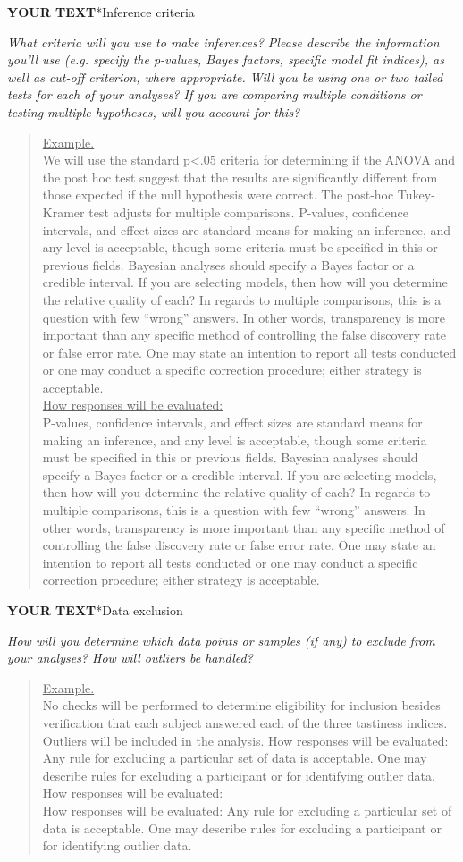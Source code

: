 \documentclass{article}
\newcommand{\example}[2]{\vspace{-0.3cm}\begin{quote}\underline{Example.}\\#1\ifx#2\undefined \else \\[0.2cm]\underline{How responses will be evaluated:}\\#2\fi\\\end{quote}}
\newcommand{\yourtext}[1]{\noindent\textbf{\color{red}YOUR TEXT}}
\begin{document}
	\yourtext
	
	\subsection*{Inference criteria}
	
	\ifx\hidehints\undefined
	
	\textit{%
		What criteria will you use to make inferences? Please describe the information you'll use (e.g. specify the p-values, Bayes factors, specific model fit indices), as well as cut-off criterion, where appropriate. Will you be using one or two tailed tests for each of your analyses? If you are comparing multiple conditions or testing multiple hypotheses, will you account for this? 
	}\\
	
	\example{
		We will use the standard p<.05 criteria for determining if the ANOVA and the post hoc test suggest that the results are significantly different from those expected if the null hypothesis were correct. The post-hoc Tukey-Kramer test adjusts for multiple comparisons.
	}{P-values, confidence intervals, and effect sizes are standard means for making an inference, and any level is acceptable, though some criteria must be specified in this or previous fields. Bayesian analyses should specify a Bayes factor or a credible interval. If you are selecting models, then how will you determine the relative quality of each? In regards to multiple comparisons, this is a question with few “wrong” answers. In other words, transparency is more important than any specific method of controlling the false discovery rate or false error rate. One may state an intention to report all tests conducted or one may conduct a specific correction procedure; either strategy is acceptable.}
	\fi
	
	\yourtext
	
	\subsection*{Data exclusion}
	
	\ifx\hidehints\undefined
	
	\textit{%
		How will you determine which data points or samples (if any) to exclude from your analyses? How will outliers be handled?
	}\\
	
	\example{
		No checks will be performed to determine eligibility for inclusion besides verification that each subject answered each of the three tastiness indices. Outliers will be included in the analysis.
		}{How responses will be evaluated: Any rule for excluding a particular set of data is acceptable. One may describe rules for excluding a participant or for identifying outlier data.}
	\fi
	
\end{document}
